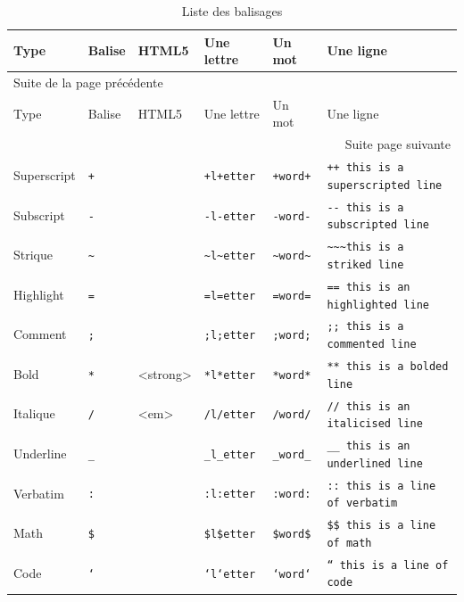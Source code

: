 \documentclass[a4paper,12pt]{article}
\begin{document}
\begin{longtable}{llllll}
\caption{\label{tab:org93900dd}Liste des balisages}
\\
\hline
Type & Balise & HTML5 & Une lettre & Un mot & Une ligne\\
\hline
\endfirsthead
\multicolumn{6}{l}{Suite de la page précédente} \\
\hline

Type & Balise & HTML5 & Une lettre & Un mot & Une ligne \\

\hline
\endhead
\hline\multicolumn{6}{r}{Suite page suivante} \\
\endfoot
\endlastfoot
\hline
Superscript & \texttt{+} &  & \texttt{+l+etter} & \texttt{+word+} & \texttt{++ this is a superscripted line}\\
Subscript & \texttt{-} &  & \texttt{-l-etter} & \texttt{-word-} & \texttt{-{}-{} this is a subscripted line}\\
Strique & \texttt{\textasciitilde{}} &  & \texttt{\textasciitilde{}l\textasciitilde{}etter} & \texttt{\textasciitilde{}word\textasciitilde{}} & \texttt{\textasciitilde{}\textasciitilde{}\textasciitilde{}this is a striked line}\\
Highlight & \texttt{=} &  & \texttt{=l=etter} & \texttt{=word=} & \texttt{== this is an highlighted line}\\
Comment & \texttt{;} &  & \texttt{;l;etter} & \texttt{;word;} & \texttt{;; this is a commented line}\\
Bold & \texttt{*} & <strong> & \texttt{*l*etter} & \texttt{*word*} & \texttt{** this is a bolded line}\\
Italique & \texttt{/} & <em> & \texttt{/l/etter} & \texttt{/word/} & \texttt{// this is an italicised line}\\
Underline & \texttt{\_} &  & \texttt{\_l\_etter} & \texttt{\_word\_} & \texttt{\_\_ this is an underlined line}\\
Verbatim & \texttt{:} &  & \texttt{:l:etter} & \texttt{:word:} & \texttt{:: this is a line of verbatim}\\
Math & \texttt{\$} &  & \texttt{\$l\$etter} & \texttt{\$word\$} & \texttt{\$\$ this is a line of math}\\
Code & \texttt{`} &  & \texttt{`l`etter} & \texttt{`word`} & \texttt{`` this is a line of code}\\
\hline
\end{longtable}
\end{document}
